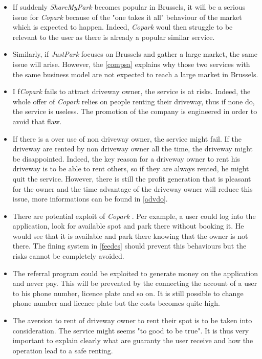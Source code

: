\documentclass[12pt,a4paper,oneside]{book}
\newcommand{\bp}{\textit{Copark }}
\begin{document}
\begin{itemize}

\item If suddenly \textit{ShareMyPark} becomes popular in Brussels, it will be a serious issue for \bp because of the "one takes it all" behaviour of the market which is expected to happen. Indeed, \bp woul then struggle to be relevant to the user as there is already a popular similar service.

\item Similarly, if \textit{JustPark} focuses on Brussels and gather a large market, the same issue will arise. However, the \autoref{compsa} explains why those two services with the same business model are not expected to reach a large market in Brussels.

\item I f\bp fails to attract driveway owner, the service is at risks. Indeed, the whole offer of \bp relies on people renting their driveway, thus if none do, the service is useless. The promotion of the company is engineered in order to avoid that flaw.

\item If there is a over use of non driveway owner, the service might fail. If the driveway are rented by non driveway owner all the time, the driveway might be disappointed. Indeed, the key reason for a driveway owner to rent his driveway is to be able to rent others, so if they are always rented, he might quit the service. However, there is still the profit generation that is pleasant for the owner and the time advantage of the driveway owner will reduce this issue, more informations can be found in \autoref{advdo}.

\item There are potential exploit of \bp. Per example, a user could log into the application, look for available spot and park there without booking it. He would see that it is available and park there knowing that the owner is not there. The fining system in \autoref{feedes} should prevent this behaviours but the risks cannot be completely avoided.

\item The referral program could be exploited to generate money on the application and never pay. This will be prevented by the connecting the account of a user to his phone number, licence plate and so on. It is still possible to change phone number and licence plate but the costs becomes quite high.

\item The aversion to rent of driveway owner to rent their spot is to be taken into consideration. The service might seems "to good to be true". It is thus very important to explain clearly what are guaranty the user receive and how the operation lead to a safe renting.


\end{itemize}
\end{document}
